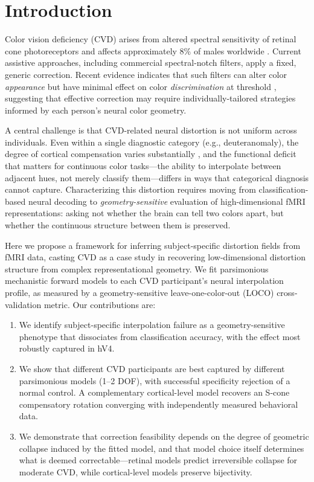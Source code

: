 \documentclass{article}
\begin{document}
\section{Introduction}
\label{sec:intro}

Color vision deficiency (CVD) arises from altered spectral sensitivity of retinal cone photoreceptors and affects approximately 8\% of males worldwide \cite{placeholder_machado2009}.
Current assistive approaches, including commercial spectral-notch filters, apply a fixed, generic correction.
Recent evidence indicates that such filters can alter color \emph{appearance} but have minimal effect on color \emph{discrimination} at threshold \cite{placeholder_somers2024}, suggesting that effective correction may require individually-tailored strategies informed by each person's neural color geometry.

A central challenge is that CVD-related neural distortion is not uniform across individuals.
Even within a single diagnostic category (e.g., deuteranomaly), the degree of cortical compensation varies substantially \cite{placeholder_tregillus2021}, and the functional deficit that matters for continuous color tasks---the ability to interpolate between adjacent hues, not merely classify them---differs in ways that categorical diagnosis cannot capture.
Characterizing this distortion requires moving from classification-based neural decoding to \emph{geometry-sensitive} evaluation of high-dimensional fMRI representations: asking not whether the brain can tell two colors apart, but whether the continuous structure between them is preserved.

Here we propose a framework for inferring subject-specific distortion fields from fMRI data, casting CVD as a case study in recovering low-dimensional distortion structure from complex representational geometry.
We fit parsimonious mechanistic forward models to each CVD participant's neural interpolation profile, as measured by a geometry-sensitive leave-one-color-out (LOCO) cross-validation metric.
Our contributions are:
\begin{enumerate}
    \item We identify subject-specific interpolation failure as a geometry-sensitive phenotype that dissociates from classification accuracy, with the effect most robustly captured in hV4.
    \item We show that different CVD participants are best captured by different parsimonious models (1--2 DOF), with successful specificity rejection of a normal control.
    A complementary cortical-level model recovers an S-cone compensatory rotation converging with independently measured behavioral data.
    \item We demonstrate that correction feasibility depends on the degree of geometric collapse induced by the fitted model, and that model choice itself determines what is deemed correctable---retinal models predict irreversible collapse for moderate CVD, while cortical-level models preserve bijectivity.
\end{enumerate}
\end{document}
